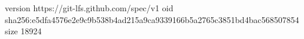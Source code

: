 version https://git-lfs.github.com/spec/v1
oid sha256:e5dfa4576e2e9c9b538b4ad215a9ca9339166b5a2765c3851bd4bac568507854
size 18924
